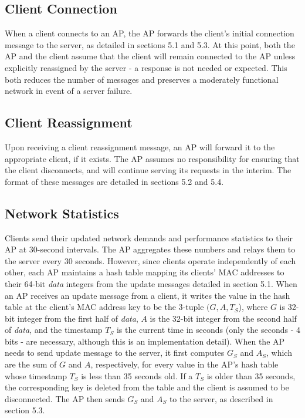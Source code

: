 \documentclass[10pt,journal,compsoc]{IEEEtran}
\begin{document}
		\subsection{Client Connection}
		When a client connects to an AP, the AP forwards the client's initial connection message to the server, as detailed in sections 5.1 and 5.3. At this point, both the AP and the client assume that the client will remain connected to the AP unless explicitly reassigned by the server - a response is not needed or expected. This both reduces the number of messages and preserves a moderately functional network in event of a server failure.
		
		\subsection{Client Reassignment} Upon receiving a client reassignment message, an AP will forward it to the appropriate client, if it exists. The AP assumes no responsibility for ensuring that the client disconnects, and will continue serving its requests in the interim. The format of these messages are detailed in sections 5.2 and 5.4.
		
		\subsection{Network Statistics}
		Clients send their updated network demands and performance statistics to their AP at 30-second intervals. The AP aggregates these numbers and relays them to the server every 30 seconds. However, since clients operate independently of each other, each AP maintains a hash table mapping its clients' MAC addresses to their 64-bit \textit{data} integers from the update messages detailed in section 5.1. When an AP receives an update message from a client, it writes the value in the hash table at the client's MAC address key to be the 3-tuple \((G, A, T_S\)), where \(G\) is 32-bit integer from the first half of \textit{data}, \(A\) is the 32-bit integer from the second half of \textit{data}, and the timestamp \(T_S\) is the current time in seconds (only the seconds - 4 bits - are necessary, although this is an implementation detail). When the AP needs to send  update message to the server, it first computes \(G_S\) and \(A_S\), which are the sum of \(G\) and \(A\), respectively, for every value in the AP's hash table whose timestamp \(T_S\) is less than 35 seconds old. If a \(T_S\) is older than 35 seconds, the corresponding key is deleted from the table and the client is assumed to be disconnected. The AP then sends \(G_S\) and \(A_S\) to the server, as described in section 5.3.
		
\end{document}
